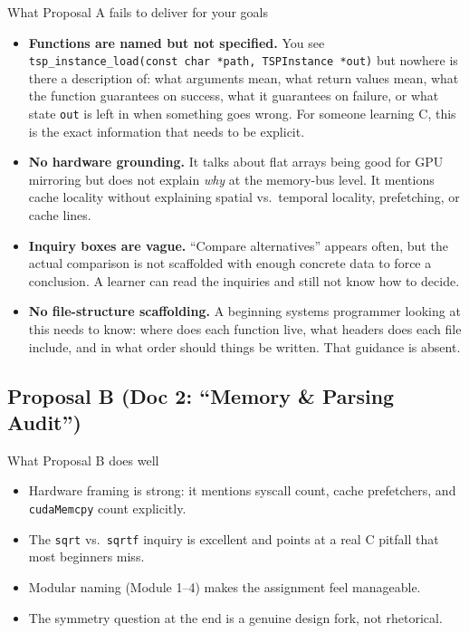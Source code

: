 \begin{critique}{What Proposal A fails to deliver for your goals}
\begin{itemize}
  \item \textbf{Functions are named but not specified.} You see \texttt{tsp\_instance\_load(const char *path, TSPInstance *out)} but nowhere is there a description of: what arguments mean, what return values mean, what the function guarantees on success, what it guarantees on failure, or what state \texttt{out} is left in when something goes wrong. For someone learning C, this is the exact information that needs to be explicit.
  \item \textbf{No hardware grounding.} It talks about flat arrays being good for GPU mirroring but does not explain \emph{why} at the memory-bus level. It mentions cache locality without explaining spatial vs.\ temporal locality, prefetching, or cache lines.
  \item \textbf{Inquiry boxes are vague.} ``Compare alternatives'' appears often, but the actual comparison is not scaffolded with enough concrete data to force a conclusion. A learner can read the inquiries and still not know how to decide.
  \item \textbf{No file-structure scaffolding.} A beginning systems programmer looking at this needs to know: where does each function live, what headers does each file include, and in what order should things be written. That guidance is absent.
\end{itemize}
\end{critique}

\subsection{Proposal B (Doc 2: ``Memory \& Parsing Audit'')}

\begin{goodbox}{What Proposal B does well}
\begin{itemize}
  \item Hardware framing is strong: it mentions syscall count, cache prefetchers, and \texttt{cudaMemcpy} count explicitly.
  \item The \texttt{sqrt} vs.\ \texttt{sqrtf} inquiry is excellent and points at a real C pitfall that most beginners miss.
  \item Modular naming (Module 1--4) makes the assignment feel manageable.
  \item The symmetry question at the end is a genuine design fork, not rhetorical.
\end{itemize}
\end{goodbox}

